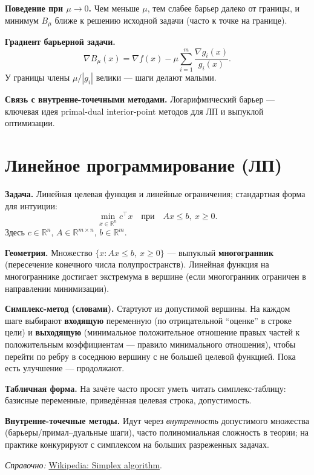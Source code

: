 \documentclass[12pt,a4paper]{article}
\newcommand{\R}{\mathbb{R}}
\newcommand{\grad}{\nabla}
\begin{document}
\textbf{Поведение при \(\mu\to0\).} Чем меньше \(\mu\), тем слабее барьер далеко от границы, и минимум \(B_\mu\) ближе к решению исходной задачи (часто к точке на границе).

\textbf{Градиент барьерной задачи.}
\[
  \grad B_\mu(x)=\grad f(x)-\mu\sum_{i=1}^m \frac{\grad g_i(x)}{g_i(x)}.
\]
У границы члены \(\mu/|g_i|\) велики --- шаги делают малыми.

\textbf{Связь с внутренне-точечными методами.} Логарифмический барьер --- ключевая идея primal-dual interior-point методов для ЛП и выпуклой оптимизации.

\section{Линейное программирование (ЛП)}
\textbf{Задача.} Линейная целевая функция и линейные ограничения; стандартная форма для интуиции:
\[
  \min_{x\in\R^n} c^\top x\quad\text{при}\quad Ax\le b,\ x\ge 0.
\]
Здесь \(c\in\R^n\), \(A\in\R^{m\times n}\), \(b\in\R^m\).

\textbf{Геометрия.} Множество \(\{x:Ax\le b,\ x\ge0\}\) --- выпуклый \textbf{многогранник} (пересечение конечного числа полупространств). Линейная функция на многограннике достигает экстремума в вершине (если многогранник ограничен в направлении минимизации).

\textbf{Симплекс-метод (словами).} Стартуют из допустимой вершины. На каждом шаге выбирают \textbf{входящую} переменную (по отрицательной ``оценке'' в строке цели) и \textbf{выходящую} (минимальное положительное отношение правых частей к положительным коэффициентам --- правило минимального отношения), чтобы перейти по ребру в соседнюю вершину с не большей целевой функцией. Пока есть улучшение --- продолжают.

\textbf{Табличная форма.} На зачёте часто просят уметь читать симплекс-таблицу: базисные переменные, приведённая целевая строка, допустимость.

\textbf{Внутренне-точечные методы.} Идут через \emph{внутренность} допустимого множества (барьеры/примал--дуальные шаги), часто полиномиальная сложность в теории; на практике конкурируют с симплексом на больших разреженных задачах.

\textit{Справочно:} \href{https://en.wikipedia.org/wiki/Simplex_algorithm}{Wikipedia: Simplex algorithm}.

\end{document}
